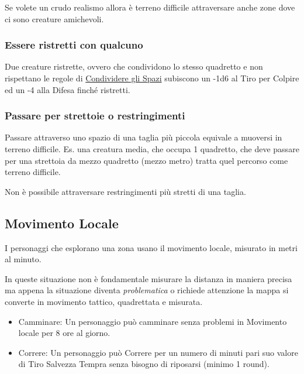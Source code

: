 \begin{multicols}{2}
\begin{changemargin}{0.3cm}{0.3cm}\begin{narratore} %
Se volete un crudo realismo allora è terreno difficile attraversare anche zone dove ci sono creature amichevoli. \end{narratore}\end{changemargin}

\subsubsection{Essere ristretti con qualcuno}
Due creature ristrette, ovvero che condividono lo stesso quadretto e non rispettano le regole di \hyperlink{condividereglispazi}{Condividere gli Spazi} subiscono un -1d6 al Tiro per Colpire ed un -4 alla Difesa finché ristretti.\hypertarget{ristretti}{}\label{ristretti}

\subsubsection{Passare per strettoie o restringimenti}

Passare attraverso uno spazio di una taglia più piccola equivale a muoversi in terreno difficile. Es. una creatura media, che occupa 1 quadretto, che deve passare per una strettoia da mezzo quadretto (mezzo metro) tratta quel percorso come terreno difficile.

Non è possibile attraversare restringimenti più stretti di una taglia.

\subsection{Movimento Locale}\label{movimentolocale}

I personaggi che esplorano una zona usano il movimento locale, misurato in metri al minuto.

In queste situazione non è fondamentale misurare la distanza in maniera precisa ma appena la situazione diventa \emph{problematica} o richiede attenzione la mappa si converte in movimento tattico, quadrettata e misurata.

\begin{itemize}[leftmargin=*] \setlength{\itemsep}{0pt}
\item
Camminare: Un personaggio può camminare senza problemi in Movimento locale per 8 ore al giorno.
\item
Correre: Un personaggio può Correre per un numero di minuti pari suo valore di Tiro Salvezza Tempra senza bisogno di riposarsi (minimo 1 round).
\end{itemize}


\end{multicols}
